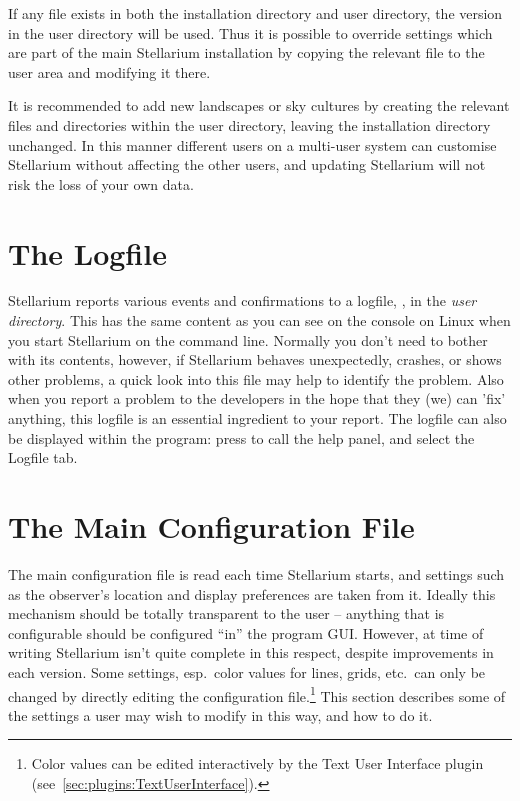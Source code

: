 If any file exists in both the installation directory and user
directory, the version in the user directory will be used. Thus it is
possible to override settings which are part of the main Stellarium
installation by copying the relevant file to the user area and modifying
it there.

It is recommended to add new landscapes or sky cultures by creating the relevant files
and directories within the user directory, leaving the installation
directory unchanged. In this manner different users on a multi-user
system can customise Stellarium without affecting the other users, and 
updating Stellarium will not risk the loss of your own data. 


\section{The Logfile}
\label{sec:LogFile}

Stellarium reports various events and confirmations to a logfile, , 
in the \emph{user directory}. This has the same content as you can see on the console 
on Linux when you start Stellarium on the command line. Normally you don't need to bother with its contents, 
however, if Stellarium behaves unexpectedly, crashes, or shows other problems, a quick look into this 
file may help to identify the problem. Also when you report a problem to the developers in the hope 
that they (we) can 'fix' anything, this logfile is an essential ingredient to your report. 
The logfile can also be displayed within the program: press  to call the help panel, and select the Logfile tab. 


\section{The Main Configuration File}
\label{sec:ConfigurationFile}

The main configuration file is read each time Stellarium starts, and
settings such as the observer's location and display preferences are
taken from it. Ideally this mechanism should be totally transparent to
the user -- anything that is configurable should be configured ``in''
the program GUI. However, at time of writing Stellarium isn't quite
complete in this respect, despite improvements in each version. Some
settings, esp.\ color values for lines, grids, etc.\ can only be
changed by directly editing the configuration file.\footnote{Color
  values can be edited interactively by the Text User Interface plugin
  (see~\ref{sec:plugins:TextUserInterface}).} This section describes
some of the settings a user may wish to modify in this way, and how to
do it.

